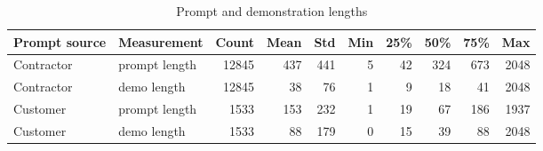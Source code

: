\begin{table}[tp]
    \centering
    \caption{Prompt and demonstration lengths}
    \label{tab:prompt-and-demo-length}
    \begin{tabular}{llrrrrrrrr}
    \toprule 
    Prompt source & Measurement & Count  & Mean  & Std  & Min  & 25\%  & 50\%  & 75\%  & Max \\
    \midrule
    Contractor & prompt length  & 12845 & 437 & 441 & 5 & 42 & 324 & 673 & 2048 \\
    Contractor & demo length & 12845 & 38 & 76 & 1 & 9 & 18 & 41 & 2048 \\
    Customer & prompt length & 1533 & 153 & 232 & 1 & 19 & 67 & 186 & 1937 \\
    Customer & demo length & 1533 & 88 & 179 & 0 & 15 & 39 & 88 & 2048 \\
    \bottomrule
    \end{tabular}
\end{table}

